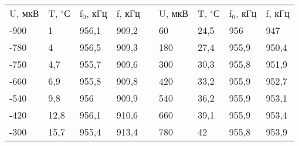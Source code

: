 \documentclass[a4paper,12pt]{article}
\begin{document}
\begin{table}[H]
\begin{tabular}{|l|l|l|l|l|l|l|l|l|}
\cline{1-4} \cline{6-9}
\multicolumn{1}{|c|}{U, мкВ} & \multicolumn{1}{c|}{T, $^\circ$С} & \multicolumn{1}{c|}{f$_0$, кГц} & \multicolumn{1}{c|}{f, кГц} &  & \multicolumn{1}{c|}{U, мкВ} & \multicolumn{1}{c|}{T, $^\circ$С} & \multicolumn{1}{c|}{f$_0$, кГц} & \multicolumn{1}{c|}{f, кГц} \\ \cline{1-4} \cline{6-9} 
-900                         & 1                         & 956,1                         & 909,2                       &  & 60                          & 24,5                      & 956                           & 947                         \\ \cline{1-4} \cline{6-9} 
-780                         & 4                         & 956,5                         & 909,3                       &  & 180                         & 27,4                      & 955,9                         & 950,4                       \\ \cline{1-4} \cline{6-9} 
-750                         & 4,7                       & 955,7                         & 909,6                       &  & 300                         & 30,3                      & 955,8                         & 951,9                       \\ \cline{1-4} \cline{6-9} 
-660                         & 6,9                       & 955,8                         & 909,8                       &  & 420                         & 33,2                      & 955,9                         & 952,7                       \\ \cline{1-4} \cline{6-9} 
-540                         & 9,8                       & 956                           & 909,9                       &  & 540                         & 36,2                      & 955,9                         & 953,1                       \\ \cline{1-4} \cline{6-9} 
-420                         & 12,8                      & 956,1                         & 910,6                       &  & 660                         & 39,1                      & 955,9                         & 953,4                       \\ \cline{1-4} \cline{6-9} 
-300                         & 15,7                      & 955,4                         & 913,4                       &  & 780                         & 42                        & 955,8                         & 953,9                       \\ \cline{1-4} \cline{6-9} 

\end{tabular}
\end{table}
\end{document}
